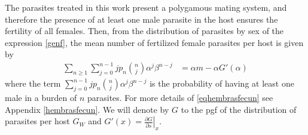 \documentclass[12pt,a4paper]{article}
\theoremstyle{plain}%
\theoremstyle{definition}
\theoremstyle{remark}
\begin{document}
	The parasites treated in this work present a polygamous mating system, and therefore the presence of at least one male parasite in the host ensures the fertility of all females.
	Then, from the distribution of parasites by sex 
	of the expression 
	\eqref{genf}, the mean number of fertilized female parasites per host is given by
	\begin{equation}\label{eqhembrasfecun}
	\begin{split}
	\sum_{n\geq 1}\sum_{j=0}^{n-1}j p_n\binom{n}{j}\alpha^j\beta^{n-j}
	&=\alpha  m - \alpha G'(\alpha)
	\end{split}
	\end{equation}
	where the term $\sum_{j=0}^{n-1}j p_n\binom{n}{j}\alpha^j\beta^{n-j}$ 
	is the probability of having at least one male in a burden of $n$ parasites. 
	For more details of \eqref{eqhembrasfecun} see Appendix \eqref{hembrasfecun}. 
	We will denote by $G$ to the pgf of the distribution of parasites per host $G_W$
	and  $G'(x)=\left.\frac{\partial G}{\partial s}\right|_{x}$.
	
\end{document}
